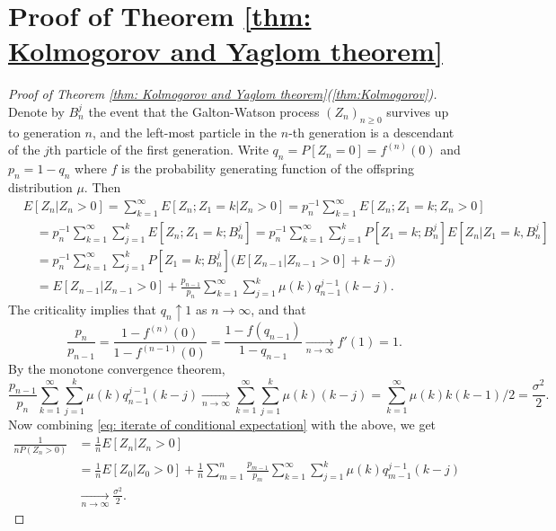 \documentclass[UTF8]{pkuthss}
\theoremstyle{plain}
\theoremstyle{definition}
\numberwithin{equation}{section}
\begin{document}
\section{Proof of Theorem \ref{thm: Kolmogorov and Yaglom theorem}}
\label{sec: proofs}
\begin{proof}[Proof of Theorem \ref{thm: Kolmogorov and Yaglom theorem}(\ref{thm:Kolmogorov})]
	Denote by $B_n^j$ the event that the Galton-Watson process
	$(Z_n)_{n\geq 0}$
	survives up to generation $n$, and the left-most particle in the $n$-th generation is
	a descendant of the $j$th particle of the first generation.
	Write $q_n = P[Z_n = 0] = f^{(n)}(0)$ and $p_n = 1- q_n$ where $f$ is the probability generating function of the offspring distribution $\mu$.
	Then
\begin{align}
	\label{eq: iterate of conditional expectation}
	&E[Z_n| Z_n>0]
	= \sum_{k=1}^\infty E[Z_n; Z_1=k| Z_n>0]
	= p_n^{-1} \sum_{k=1}^\infty E[Z_n; Z_1=k;Z_{n}>0]
	\\&\quad = p_n^{-1} \sum_{k=1}^\infty \sum_{j=1}^k E[Z_n; Z_1=k;B_n^j]
	= p_n^{-1} \sum_{k=1}^\infty \sum_{j=1}^k P[Z_1=k;B_n^j] E[Z_n| Z_1=k,B_n^j]
	\\&\quad = p_n^{-1} \sum_{k=1}^\infty \sum_{j=1}^k P[Z_1=k;B_n^j] \Big( E[Z_{n-1}| Z_{n-1}>0] +k-j\Big)
	\\&\quad = E[Z_{n-1}|Z_{n-1}> 0]  + \frac{p_{n-1}}{p_n}\sum_{k=1}^\infty \sum_{j=1}^k \mu(k) q_{n-1}^{j-1}(k-j).
\end{align}
	The criticality implies that $q_n \uparrow 1$ as $n \to \infty$, and that
	\[
	\frac{p_n}{p_{n-1}} = \frac{1- f^{(n)}(0)}{1-f^{(n-1)}(0)} = \frac{1- f(q_{n-1})}{1-q_{n-1}} \xrightarrow[n \to \infty]{} f'(1) = 1.
	\]
	By the monotone convergence theorem,
	\[
	\frac{p_{n-1}}{p_n} \sum_{k=1}^\infty \sum_{j=1}^k \mu(k) q_{n-1}^{j-1} (k-j)
	\xrightarrow[n \to \infty]{} \sum_{k=1}^\infty \sum_{j=1}^k \mu(k) (k-j)
	=  \sum_{k=1}^\infty \mu(k) k(k-1)/2
	= \frac{\sigma^2}{2}.
	\]
	Now combining \eqref{eq: iterate of conditional expectation} with the above, we get
\begin{align}
	\frac{1}{n P(Z_n > 0)}
	&= \frac{1}{n} E[Z_n | Z_n > 0]
	\\&= \frac{1}{n}E[Z_0| Z_0 > 0] + \frac{1}{n} \sum_{m = 1}^n \frac{p_{m-1}}{p_m}\sum_{k=1}^\infty \sum_{j=1}^k \mu(k) q_{m-1}^{j-1}(k-j)
	\\& \xrightarrow[n \to \infty]{} \frac{\sigma^2}{2}.
\end{align}
\end{proof}
\end{document}
